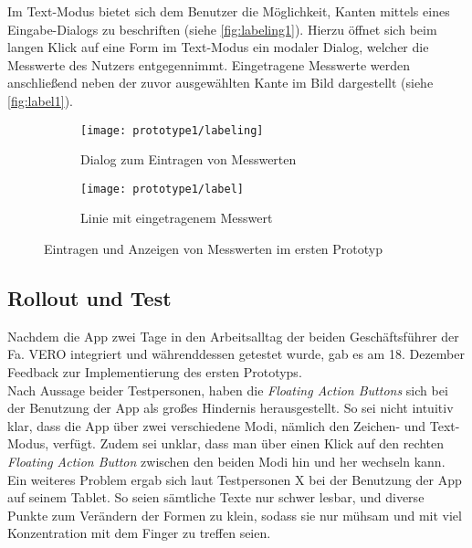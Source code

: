 Im Text-Modus bietet sich dem Benutzer die Möglichkeit, Kanten mittels eines Eingabe-Dialogs zu beschriften (siehe \autoref{fig:labeling1}).
Hierzu öffnet sich beim langen Klick auf eine Form im Text-Modus ein modaler Dialog, welcher die Messwerte des Nutzers entgegennimmt.
Eingetragene Messwerte werden anschließend neben der zuvor ausgewählten Kante im Bild dargestellt (siehe \autoref{fig:label1}). 

\begin{figure}[h]
  \begin{subfigure}[t]{0.4\textwidth}
    \texttt{[image: prototype1/labeling]}
    \caption{Dialog zum Eintragen von Messwerten}
    \label{fig:labeling1}
  \end{subfigure}
  \begin{subfigure}[t]{0.4\textwidth}
    \texttt{[image: prototype1/label]}
    \caption{Linie mit eingetragenem Messwert}
    \label{fig:label1}
  \end{subfigure}
  \centering
  \caption{Eintragen und Anzeigen von Messwerten im ersten Prototyp}
\end{figure}

\subsection{Rollout und Test}\label{subsec:test1}
Nachdem die App zwei Tage in den Arbeitsalltag der beiden Geschäftsführer der Fa. VERO integriert und währenddessen getestet wurde, gab es am 18. Dezember Feedback zur Implementierung des ersten Prototyps. \\

Nach Aussage beider Testpersonen, haben die \emph{Floating Action Buttons} sich bei der Benutzung der App als großes Hindernis herausgestellt.
So sei nicht intuitiv klar, dass die App über zwei verschiedene Modi, nämlich den Zeichen- und Text-Modus, verfügt.
Zudem sei unklar, dass man über einen Klick auf den rechten \emph{Floating Action Button} zwischen den beiden Modi hin und her wechseln kann. \\

Ein weiteres Problem ergab sich laut Testpersonen X  bei der Benutzung der App auf seinem Tablet.
So seien sämtliche Texte nur schwer lesbar, und diverse Punkte zum Verändern der Formen zu klein, sodass sie nur mühsam und mit viel Konzentration mit dem Finger zu treffen seien. \\

